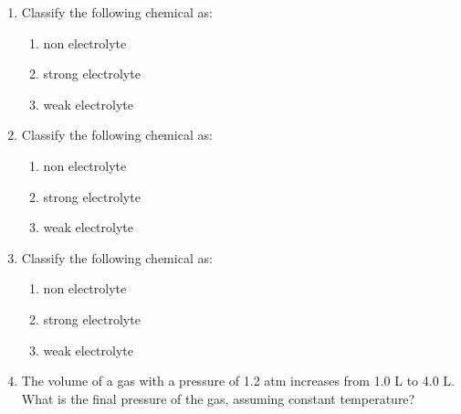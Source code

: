\documentclass[main.tex]{subfiles}
\begin{document}
\begin{fullwidth}
\begin{multicols*}{2}
\begin{enumerate}
\item  Classify the following chemical as: 
\begin{enumerate}[label=(\alph*)]
\item non electrolyte			
\item strong electrolyte
\item weak electrolyte			
\end{enumerate}

\item  Classify the following chemical as: 
\begin{enumerate}[label=(\alph*)]
\item non electrolyte			
\item strong electrolyte
\item weak electrolyte			
\end{enumerate}

\item  Classify the following chemical as: 
\begin{enumerate}[label=(\alph*)]
\item non electrolyte			
\item strong electrolyte
\item weak electrolyte			
\end{enumerate}




\item  The volume of a gas with a pressure of 1.2 atm increases from 1.0 L to 4.0 L. What is the final pressure of the gas, assuming constant temperature?
\begin{enumerate}[label=(\alph*)]\vspace{-0.5cm}
\end{enumerate}\vspace{-0.5cm}


\end{enumerate}
\end{multicols*}
\end{fullwidth}
\end{document}
